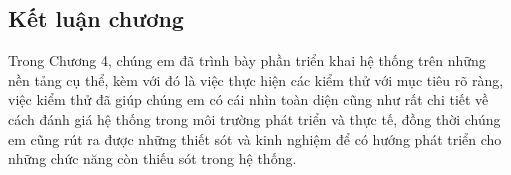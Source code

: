 \subsection{Kết luận chương}
  Trong Chương 4, chúng em đã trình bày phần triển khai hệ thống trên những nền tảng cụ thể, kèm với đó là việc thực hiện
  các kiểm thử với mục tiêu rõ ràng, việc kiểm thử đã giúp chúng em có cái nhìn toàn diện cũng như rất chi tiết về cách đánh giá 
  hệ thống trong môi trường phát triển và thực tế, đồng thời chúng em cũng rút ra được những thiết sót và kinh nghiệm
  để có hướng phát triển cho những chức năng còn thiếu sót trong hệ thống.
\newpage
